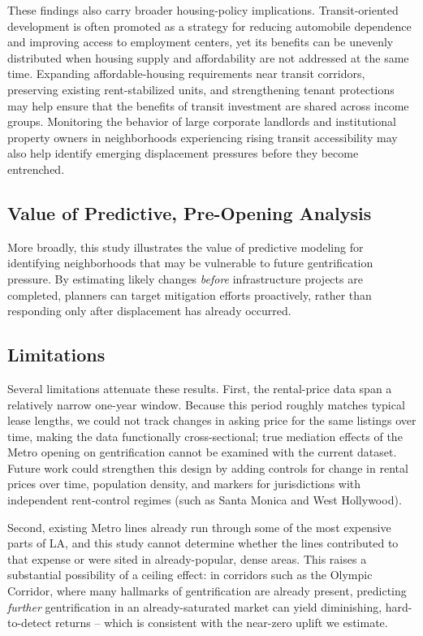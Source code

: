 \documentclass[11pt]{article}
\begin{document}
These findings also carry broader housing-policy implications. Transit-oriented development is often promoted as a strategy for reducing automobile dependence and improving access to employment centers, yet its benefits can be unevenly distributed when housing supply and affordability are not addressed at the same time. Expanding affordable-housing requirements near transit corridors, preserving existing rent-stabilized units, and strengthening tenant protections may help ensure that the benefits of transit investment are shared across income groups. Monitoring the behavior of large corporate landlords and institutional property owners in neighborhoods experiencing rising transit accessibility may also help identify emerging displacement pressures before they become entrenched.

\subsection{Value of Predictive, Pre-Opening Analysis}

More broadly, this study illustrates the value of predictive modeling for identifying neighborhoods that may be vulnerable to future gentrification pressure. By estimating likely changes \emph{before} infrastructure projects are completed, planners can target mitigation efforts proactively, rather than responding only after displacement has already occurred.

\subsection{Limitations}

Several limitations attenuate these results. First, the rental-price data span a relatively narrow one-year window. Because this period roughly matches typical lease lengths, we could not track changes in asking price for the same listings over time, making the data functionally cross-sectional; true mediation effects of the Metro opening on gentrification cannot be examined with the current dataset. Future work could strengthen this design by adding controls for change in rental prices over time, population density, and markers for jurisdictions with independent rent-control regimes (such as Santa Monica and West Hollywood).

Second, existing Metro lines already run through some of the most expensive parts of LA, and this study cannot determine whether the lines contributed to that expense or were sited in already-popular, dense areas. This raises a substantial possibility of a ceiling effect: in corridors such as the Olympic Corridor, where many hallmarks of gentrification are already present, predicting \emph{further} gentrification in an already-saturated market can yield diminishing, hard-to-detect returns -- which is consistent with the near-zero uplift we estimate.
\end{document}
